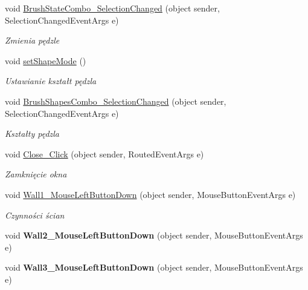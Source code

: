 \begin{DoxyCompactItemize}
void \mbox{\hyperlink{class_r6_1_1_border_window_ac90a822259767b24cb4510075be87c59}{Brush\+State\+Combo\+\_\+\+Selection\+Changed}} (object sender, Selection\+Changed\+Event\+Args e)
\begin{DoxyCompactList}\small\item\em Zmienia pędzle \end{DoxyCompactList}\item 
void \mbox{\hyperlink{class_r6_1_1_border_window_aa08320545cc38a532d0aad8ed405089d}{set\+Shape\+Mode}} ()
\begin{DoxyCompactList}\small\item\em Ustawianie kształt pędzla \end{DoxyCompactList}\item 
void \mbox{\hyperlink{class_r6_1_1_border_window_a9124fe60aaacd20c7c0d1ace0555a28b}{Brush\+Shapes\+Combo\+\_\+\+Selection\+Changed}} (object sender, Selection\+Changed\+Event\+Args e)
\begin{DoxyCompactList}\small\item\em Kształty pędzla \end{DoxyCompactList}\item 
void \mbox{\hyperlink{class_r6_1_1_border_window_a553e12d8cc547080bdf44c3c8972025a}{Close\+\_\+\+Click}} (object sender, Routed\+Event\+Args e)
\begin{DoxyCompactList}\small\item\em Zamknięcie okna \end{DoxyCompactList}\item 
void \mbox{\hyperlink{class_r6_1_1_border_window_a0fe611ab2eca4d594bd706026a7f48c2}{Wall1\+\_\+\+Mouse\+Left\+Button\+Down}} (object sender, Mouse\+Button\+Event\+Args e)
\begin{DoxyCompactList}\small\item\em Czynności ścian \end{DoxyCompactList}\item 
\mbox{\label{class_r6_1_1_border_window_a53fd2e490e7ac2b9ed194b9083f0ad30}} 
void {\bfseries Wall2\+\_\+\+Mouse\+Left\+Button\+Down} (object sender, Mouse\+Button\+Event\+Args e)
\item 
\mbox{\label{class_r6_1_1_border_window_ae4d85053d64790dcced46c500993dc35}} 
void {\bfseries Wall3\+\_\+\+Mouse\+Left\+Button\+Down} (object sender, Mouse\+Button\+Event\+Args e)
\item 

\end{DoxyCompactItemize}
